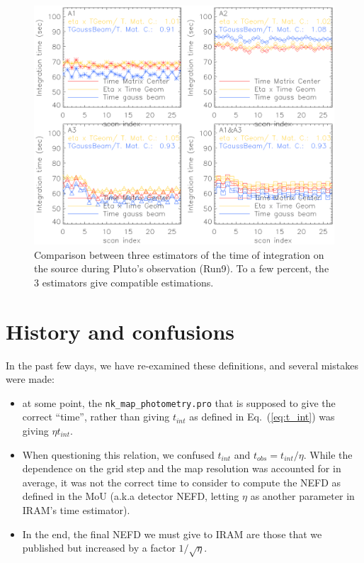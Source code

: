 \begin{figure}
\begin{center}
\includegraphics[clip, angle=0, scale =0.8]{Figures/Pluto_time_of_integration.eps}
\caption[Time of integration]{Comparison between three estimators of the time of integration on the
  source during Pluto's observation (Run9). To a few percent, the 3 estimators
  give compatible estimations.}
\label{fig:time_comparison}
\end{center}
\end{figure}



\section{History and confusions}

In the past few days, we have re-examined these definitions, and several
mistakes were made:

\begin{itemize}
\item at some point, the {\tt nk\_map\_photometry.pro} that is supposed to give
  the correct ``time'', rather than giving $t_{int}$ as defined in
  Eq.~(\ref{eq:t_int}) was giving $\eta t_{int}$.
\item When questioning this relation, we confused $t_{int}$ and $t_{obs} = t_{int}/\eta$. While
  the dependence on the grid step and the map resolution was accounted for in
  average, it was not the correct time to consider to compute the NEFD as defined in
  the MoU (a.k.a detector NEFD, letting $\eta$ as another parameter in IRAM's
  time estimator).
\item In the end, the final NEFD we must give to IRAM are those that we
  published but increased by a factor $1/\sqrt{\eta}$.
\end{itemize}



